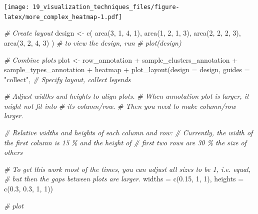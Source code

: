 \documentclass[
]{book}
\newenvironment{Shaded}{\begin{snugshade}}{\end{snugshade}}
\newcommand{\AttributeTok}[1]{\textcolor[rgb]{0.77,0.63,0.00}{#1}}
\newcommand{\CommentTok}[1]{\textcolor[rgb]{0.56,0.35,0.01}{\textit{#1}}}
\newcommand{\DecValTok}[1]{\textcolor[rgb]{0.00,0.00,0.81}{#1}}
\newcommand{\FloatTok}[1]{\textcolor[rgb]{0.00,0.00,0.81}{#1}}
\newcommand{\FunctionTok}[1]{\textcolor[rgb]{0.00,0.00,0.00}{#1}}
\newcommand{\NormalTok}[1]{#1}
\newcommand{\OtherTok}[1]{\textcolor[rgb]{0.56,0.35,0.01}{#1}}
\newcommand{\SpecialCharTok}[1]{\textcolor[rgb]{0.00,0.00,0.00}{#1}}
\newcommand{\StringTok}[1]{\textcolor[rgb]{0.31,0.60,0.02}{#1}}
\begin{document}
\texttt{[image: 19\_visualization\_techniques\_files/figure-latex/more\_complex\_heatmap-1.pdf]}

\begin{Shaded}
\begin{Highlighting}[]
\CommentTok{\# Create layout}
\NormalTok{design }\OtherTok{\textless{}{-}} \FunctionTok{c}\NormalTok{(}
  \FunctionTok{area}\NormalTok{(}\DecValTok{3}\NormalTok{, }\DecValTok{1}\NormalTok{, }\DecValTok{4}\NormalTok{, }\DecValTok{1}\NormalTok{),}
  \FunctionTok{area}\NormalTok{(}\DecValTok{1}\NormalTok{, }\DecValTok{2}\NormalTok{, }\DecValTok{1}\NormalTok{, }\DecValTok{3}\NormalTok{),}
  \FunctionTok{area}\NormalTok{(}\DecValTok{2}\NormalTok{, }\DecValTok{2}\NormalTok{, }\DecValTok{2}\NormalTok{, }\DecValTok{3}\NormalTok{),}
  \FunctionTok{area}\NormalTok{(}\DecValTok{3}\NormalTok{, }\DecValTok{2}\NormalTok{, }\DecValTok{4}\NormalTok{, }\DecValTok{3}\NormalTok{)}
\NormalTok{)}
\CommentTok{\# to view the design, run}
\CommentTok{\# plot(design)}

\CommentTok{\# Combine plots}
\NormalTok{plot }\OtherTok{\textless{}{-}}\NormalTok{ row\_annotation }\SpecialCharTok{+}\NormalTok{ sample\_clusters\_annotation }\SpecialCharTok{+}
\NormalTok{                         sample\_types\_annotation }\SpecialCharTok{+}
\NormalTok{             heatmap  }\SpecialCharTok{+}
    \FunctionTok{plot\_layout}\NormalTok{(}\AttributeTok{design =}\NormalTok{ design, }\AttributeTok{guides =} \StringTok{"collect"}\NormalTok{,}
                \CommentTok{\# Specify layout, collect legends}
                
                \CommentTok{\# Adjust widths and heights to align plots.}
                \CommentTok{\# When annotation plot is larger, it might not fit into}
        \CommentTok{\# its column/row.}
                \CommentTok{\# Then you need to make column/row larger.}
                
                \CommentTok{\# Relative widths and heights of each column and row:}
                \CommentTok{\# Currently, the width of the first column is 15 \% and the height of}
                \CommentTok{\# first two rows are 30 \% the size of others}
                
                \CommentTok{\# To get this work most of the times, you can adjust all sizes to be 1, i.e. equal, }
                \CommentTok{\# but then the gaps between plots are larger.}
                \AttributeTok{widths =} \FunctionTok{c}\NormalTok{(}\FloatTok{0.15}\NormalTok{, }\DecValTok{1}\NormalTok{, }\DecValTok{1}\NormalTok{),}
                \AttributeTok{heights =} \FunctionTok{c}\NormalTok{(}\FloatTok{0.3}\NormalTok{, }\FloatTok{0.3}\NormalTok{, }\DecValTok{1}\NormalTok{, }\DecValTok{1}\NormalTok{))}

\CommentTok{\# plot}
\end{Highlighting}
\end{Shaded}
\end{document}
